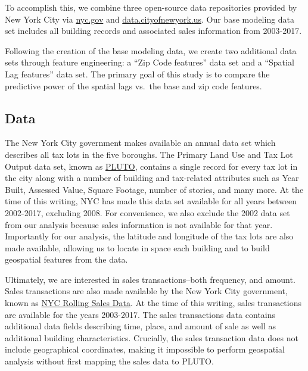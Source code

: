 \documentclass[12pt,]{article}
\begin{document}
To accomplish this, we combine three open-source data repositories
provided by New York City via \url{nyc.gov} and
\url{data.cityofnewyork.us}. Our base modeling data set includes all
building records and associated sales information from 2003-2017.

Following the creation of the base modeling data, we create two
additional data sets through feature engineering: a ``Zip Code
features'' data set and a ``Spatial Lag features'' data set. The primary
goal of this study is to compare the predictive power of the spatial
lags vs.~the base and zip code features.

\hypertarget{data}{%
\subsection{Data}\label{data}}

The New York City government makes available an annual data set which
describes all tax lots in the five boroughs. The Primary Land Use and
Tax Lot Output data set, known as
\href{https://www1.nyc.gov/site/planning/data-maps/open-data/bytes-archive.page?sorts\%5Byear\%5D=0}{PLUTO},
contains a single record for every tax lot in the city along with a
number of building and tax-related attributes such as Year Built,
Assessed Value, Square Footage, number of stories, and many more. At the
time of this writing, NYC has made this data set available for all years
between 2002-2017, excluding 2008. For convenience, we also exclude the
2002 data set from our analysis because sales information is not
available for that year. Importantly for our analysis, the latitude and
longitude of the tax lots are also made available, allowing us to locate
in space each building and to build geospatial features from the data.

Ultimately, we are interested in sales transactions--both frequency, and
amount. Sales transactions are also made available by the New York City
government, known as
\href{http://www1.nyc.gov/site/finance/taxes/property-annualized-sales-update.page}{NYC
Rolling Sales Data}. At the time of this writing, sales transactions are
available for the years 2003-2017. The sales transactions data contains
additional data fields describing time, place, and amount of sale as
well as additional building characteristics. Crucially, the sales
transaction data does not include geographical coordinates, making it
impossible to perform geospatial analysis without first mapping the
sales data to PLUTO.
\end{document}
